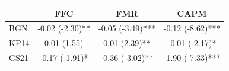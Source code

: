 \begin{tabular}{lccc}
\toprule
 & FFC & FMR & CAPM \\
\midrule
BGN & -0.02 (-2.30)** & -0.05 (-3.49)*** & -0.12 (-8.62)*** \\
KP14 & 0.01 (1.55) & 0.01 (2.39)** & -0.01 (-2.17)* \\
GS21 & -0.17 (-1.91)* & -0.36 (-3.02)** & -1.90 (-7.33)*** \\
\bottomrule
\end{tabular}
